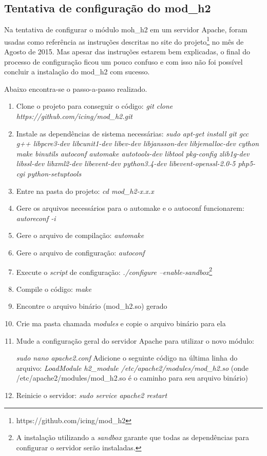 %
%

\begin{apendicesenv}
\partapendices

\chapter{Tentativa de configuração do mod\_h2}
\label{apend:tentativadeconfiguracaomodh2}

Na tentativa de configurar o módulo moh\_h2 em um servidor Apache, foram usadas como referência as instruções descritas no site do projeto\footnote{https://github.com/icing/mod\_h2} no mês de Agosto de 2015. Mas apesar das instruções estarem bem explicadas, o final do processo de configuração ficou um pouco confuso e com isso não foi possível concluir a instalação do mod\_h2 com sucesso.

Abaixo encontra-se o passo-a-passo realizado.

\begin{enumerate}
	\item Clone o projeto para conseguir o código: \textit{git clone https://github.com/icing/mod\_h2.git}
	\item Instale as dependências de sistema necessárias: \textit{sudo apt-get install git gcc g++ libpcre3-dev libcunit1-dev libev-dev libjansson-dev libjemalloc-dev cython make binutils autoconf automake autotools-dev libtool pkg-config zlib1g-dev libssl-dev libxml2-dev libevent-dev python3.4-dev libevent-openssl-2.0-5 php5-cgi python-setuptools}
	\item Entre na pasta do projeto: \textit{cd mod\_h2-x.x.x}
	\item Gere os arquivos necessários para o automake e o autoconf funcionarem: \textit{autoreconf -i}
	\item Gere o arquivo de compilação: \textit{automake}
	\item Gere o arquivo de configuração: \textit{autoconf}
	\item Execute o \textit{script} de configuração: \textit{./configure --enable-sandbox}\footnote{A instalação utilizando a \textit{sandbox} garante que todas as dependências para configurar o servidor serão instaladas.}
	\item Compile o código: \textit{make}
	\item Encontre o arquivo binário (mod\_h2.so) gerado
	\item Crie ma pasta chamada \textit{modules} e copie o arquivo binário para ela
	\item Mude a configuração geral do servidor Apache para utilizar o novo módulo:
		\begin{center}
			\textit{sudo nano apache2.conf}
			Adicione o seguinte código na última linha do arquivo: \textit{LoadModule h2\_module /etc/apache2/modules/mod\_h2.so} (onde /etc/apache2/modules/mod\_h2.so é o caminho para seu arquivo binário)
		\end{center}
	\item Reinicie o servidor: \textit{sudo service apache2 restart}
\end{enumerate}


\end{apendicesenv}
